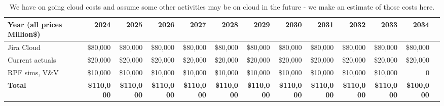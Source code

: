 \tiny \begin{longtable} {| l  |r  |r  |r  |r  |r  |r  |r  |r  |r  |r  |r  |r |} \caption{We have on going cloud costs and assume some other activities may be on cloud in the future - we make an estimate of those costs here. \label{tab:cloud}}\\ 
\hline 
\textbf{Year  (all prices Million\$)}&\textbf{2024}&\textbf{2025}&\textbf{2026}&\textbf{2027}&\textbf{2028}&\textbf{2029}&\textbf{2030}&\textbf{2031}&\textbf{2032}&\textbf{2033}&\textbf{2034} \\ \hline
{Jira Cloud}&{\$80,000}&{\$80,000}&{\$80,000}&{\$80,000}&{\$80,000}&{\$80,000}&{\$80,000}&{\$80,000}&{\$80,000}&{\$80,000}&{\$80,000} \\ \hline
{Current actuals}&{\$20,000}&{\$20,000}&{\$20,000}&{\$20,000}&{\$20,000}&{\$20,000}&{\$20,000}&{\$20,000}&{\$20,000}&{\$20,000}&{\$20,000} \\ \hline
{RPF sims, V\&V}&{\$10,000}&{\$10,000}&{\$10,000}&{\$10,000}&{\$10,000}&{\$10,000}&{\$10,000}&{\$10,000}&{\$10,000}&{\$10,000}&{0} \\ \hline
\textbf{Total}&\textbf{\$110,000}&\textbf{\$110,000}&\textbf{\$110,000}&\textbf{\$110,000}&\textbf{\$110,000}&\textbf{\$110,000}&\textbf{\$110,000}&\textbf{\$110,000}&\textbf{\$110,000}&\textbf{\$110,000}&\textbf{\$100,000} \\ \hline
\end{longtable} \normalsize
